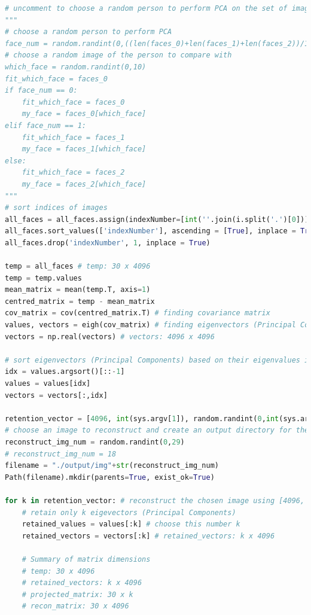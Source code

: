 \documentclass{article}
\begin{document}
\begin{flushleft}
\begin{lstlisting}[language=Python, title={Python code to perform PCA on images}]
# uncomment to choose a random person to perform PCA on the set of images of "that" person
"""
# choose a random person to perform PCA
face_num = random.randint(0,((len(faces_0)+len(faces_1)+len(faces_2))/10)-1)
# choose a random image of the person to compare with
which_face = random.randint(0,10)
fit_which_face = faces_0
if face_num == 0:
    fit_which_face = faces_0
    my_face = faces_0[which_face]
elif face_num == 1:
    fit_which_face = faces_1
    my_face = faces_1[which_face]
else:
    fit_which_face = faces_2
    my_face = faces_2[which_face]
"""
# sort indices of images
all_faces = all_faces.assign(indexNumber=[int(''.join(i.split('.')[0])) for i in all_faces.index])
all_faces.sort_values(['indexNumber'], ascending = [True], inplace = True)
all_faces.drop('indexNumber', 1, inplace = True)

temp = all_faces # temp: 30 x 4096
temp = temp.values
mean_matrix = mean(temp.T, axis=1)
centred_matrix = temp - mean_matrix
cov_matrix = cov(centred_matrix.T) # finding covariance matrix
values, vectors = eigh(cov_matrix) # finding eigenvectors (Principal Components) of covariance matrix
vectors = np.real(vectors) # vectors: 4096 x 4096

# sort eigenvectors (Principal Components) based on their eigenvalues in descending order
idx = values.argsort()[::-1]
values = values[idx]
vectors = vectors[:,idx]

retention_vector = [4096, int(sys.argv[1]), random.randint(0,int(sys.argv[1]))] # array storing number of eigevectors (Principal Components) to be used while reconstructing image
# choose an image to reconstruct and create an output directory for the same
reconstruct_img_num = random.randint(0,29)
# reconstruct_img_num = 18
filename = "./output/img"+str(reconstruct_img_num)
Path(filename).mkdir(parents=True, exist_ok=True)

for k in retention_vector: # reconstruct the chosen image using [4096, k, <k] eigevectors (Principal Components)
    # retain only k eigevectors (Principal Components)
    retained_values = values[:k] # choose this number k
    retained_vectors = vectors[:k] # retained_vectors: k x 4096

    # Summary of matrix dimensions
    # temp: 30 x 4096
    # retained_vectors: k x 4096
    # projected_matrix: 30 x k
    # recon_matrix: 30 x 4096


\end{lstlisting}
\end{flushleft}
\end{document}
